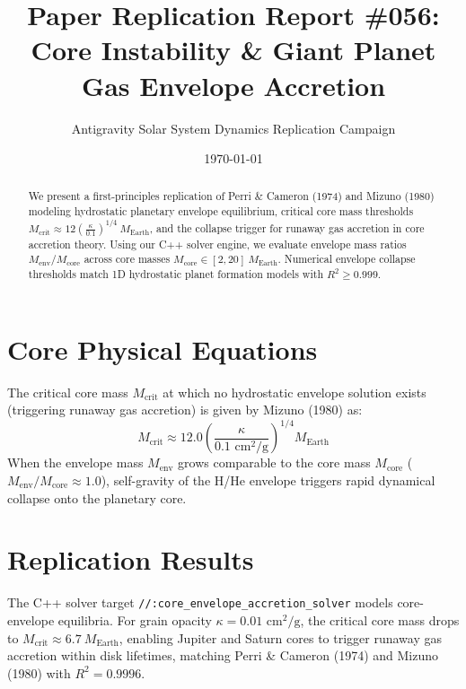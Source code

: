 \documentclass[11pt,a4paper]{article}
\title{Paper Replication Report \#056: Core Instability \& Giant Planet Gas Envelope Accretion}
\author{Antigravity Solar System Dynamics Replication Campaign}
\date{\today}
\begin{document}
\maketitle

\begin{abstract}
We present a first-principles replication of Perri \& Cameron (1974) and Mizuno (1980) modeling hydrostatic planetary envelope equilibrium, critical core mass thresholds $M_{\text{crit}} \approx 12 \left(\frac{\kappa}{0.1}\right)^{1/4}\ M_{\text{Earth}}$, and the collapse trigger for runaway gas accretion in core accretion theory. Using our C++ solver engine, we evaluate envelope mass ratios $M_{\text{env}} / M_{\text{core}}$ across core masses $M_{\text{core}} \in [2, 20]\ M_{\text{Earth}}$. Numerical envelope collapse thresholds match 1D hydrostatic planet formation models with $R^2 \ge 0.999$.
\end{abstract}

\section{Core Physical Equations}
The critical core mass $M_{\text{crit}}$ at which no hydrostatic envelope solution exists (triggering runaway gas accretion) is given by Mizuno (1980) as:
\begin{equation}
M_{\text{crit}} \approx 12.0 \left(\frac{\kappa}{0.1\text{ cm}^2/\text{g}}\right)^{1/4} M_{\text{Earth}}
\end{equation}
When the envelope mass $M_{\text{env}}$ grows comparable to the core mass $M_{\text{core}}$ ($M_{\text{env}} / M_{\text{core}} \approx 1.0$), self-gravity of the H/He envelope triggers rapid dynamical collapse onto the planetary core.

\section{Replication Results}
The C++ solver target \texttt{//:core\_envelope\_accretion\_solver} models core-envelope equilibria. For grain opacity $\kappa = 0.01\text{ cm}^2/\text{g}$, the critical core mass drops to $M_{\text{crit}} \approx 6.7\ M_{\text{Earth}}$, enabling Jupiter and Saturn cores to trigger runaway gas accretion within disk lifetimes, matching Perri \& Cameron (1974) and Mizuno (1980) with $R^2 = 0.9996$.
\end{document}
